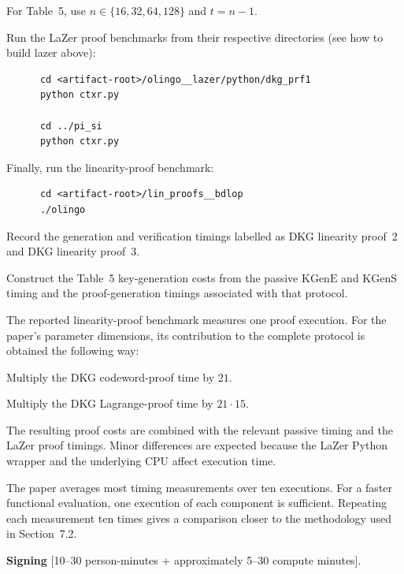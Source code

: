 \documentclass[nonacm,sigconf]{acmart}
\begin{document}
\begin{compactitem}
\begin{asparadesc}
    For Table~5, use $n\in\{16,32,64,128\}$ and $t=n-1$.

    Run the LaZer proof benchmarks from their respective directories (see how to build lazer above):

    \begin{verbatim}
      cd <artifact-root>/olingo__lazer/python/dkg_prf1
      python ctxr.py

      cd ../pi_si
      python ctxr.py
    \end{verbatim}

    Finally, run the linearity-proof benchmark:

    \begin{verbatim}
      cd <artifact-root>/lin_proofs__bdlop
      ./olingo
    \end{verbatim}

    Record the generation and verification timings labelled as DKG linearity proof~2 and DKG linearity proof~3.

    \item[Results:] Construct the Table~5 key-generation costs from the passive $\mathrm{KGenE}$ and $\mathrm{KGenS}$ timing and the proof-generation timings associated with that protocol.

    The reported linearity-proof benchmark measures one proof execution. For the paper's parameter dimensions, its contribution to the complete protocol is obtained the following way:

    \begin{compactitem}
      \item Multiply the DKG codeword-proof time by $21$.
      \item Multiply the DKG Lagrange-proof time by $21\cdot 15$.
    \end{compactitem}

    The resulting proof costs are combined with the relevant passive timing and the LaZer proof timings. Minor differences are expected because the LaZer Python wrapper and the underlying CPU affect execution time.

    The paper averages most timing measurements over ten executions. For a faster functional evaluation, one execution of each component is sufficient. Repeating each measurement ten times gives a comparison closer to the methodology used in Section~7.2.
  \end{asparadesc}

  \item[(E3):] \textbf{Signing} [10--30 person-minutes + approximately 5--30 compute minutes].


\end{compactitem}
\end{document}
